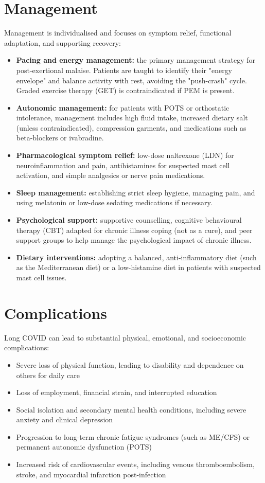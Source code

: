 \section*{Management}
Management is individualised and focuses on symptom relief, functional adaptation, and supporting recovery:
\begin{itemize}
    \item \textbf{Pacing and energy management:} the primary management strategy for post-exertional malaise. Patients are taught to identify their "energy envelope" and balance activity with rest, avoiding the "push-crash" cycle. Graded exercise therapy (GET) is contraindicated if PEM is present.
    \item \textbf{Autonomic management:} for patients with POTS or orthostatic intolerance, management includes high fluid intake, increased dietary salt (unless contraindicated), compression garments, and medications such as beta-blockers or ivabradine.
    \item \textbf{Pharmacological symptom relief:} low-dose naltrexone (LDN) for neuroinflammation and pain, antihistamines for suspected mast cell activation, and simple analgesics or nerve pain medications.
    \item \textbf{Sleep management:} establishing strict sleep hygiene, managing pain, and using melatonin or low-dose sedating medications if necessary.
    \item \textbf{Psychological support:} supportive counselling, cognitive behavioural therapy (CBT) adapted for chronic illness coping (not as a cure), and peer support groups to help manage the psychological impact of chronic illness.
    \item \textbf{Dietary interventions:} adopting a balanced, anti-inflammatory diet (such as the Mediterranean diet) or a low-histamine diet in patients with suspected mast cell issues.
\end{itemize}

\section*{Complications}
Long COVID can lead to substantial physical, emotional, and socioeconomic complications:
\begin{itemize}
    \item Severe loss of physical function, leading to disability and dependence on others for daily care
    \item Loss of employment, financial strain, and interrupted education
    \item Social isolation and secondary mental health conditions, including severe anxiety and clinical depression
    \item Progression to long-term chronic fatigue syndromes (such as ME/CFS) or permanent autonomic dysfunction (POTS)
    \item Increased risk of cardiovascular events, including venous thromboembolism, stroke, and myocardial infarction post-infection
\end{itemize}

